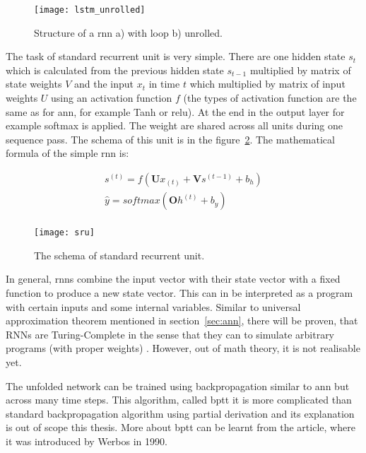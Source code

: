 \documentclass[thesis=M,english]{FITthesis}[2012/10/20]
\begin{document}
\begin{figure}[ht]\centering
    \texttt{[image: lstm\_unrolled]}
    \caption{Structure of a \gls{rnn} a) with loop b) unrolled.\cite{lstm_images}}\label{fig:rnn}
\end{figure}

The task of standard recurrent unit is very simple. There are one hidden state $s_t$ which is calculated from the previous hidden state $s_{t-1}$ multiplied by matrix of state weights $V$ and the input $x_t$ in time $t$ which multiplied by matrix of input weights $U$ using an activation function $f$ (the types of activation function are the same as for \gls{ann}, for example Tanh or \gls{relu}). At the end in the output layer for example softmax is applied. The weight are shared across all units during one sequence pass. The schema of this unit is in the figure~\ref{fig:sru}. The mathematical formula of the simple \gls{rnn} is:

\begin{equation}
\begin{multlined}
s^{(t)} = f(\mathbf{U} x_{(t)} + \mathbf{V} s^{(t-1)} + b_h) \\ 
\hat{y} = softmax(\mathbf{O} h^{(t)} + b_y)\\
\end{multlined}
\end{equation}

\begin{figure}[ht]\centering
    \texttt{[image: sru]}
    \caption{The schema of standard recurrent unit.}\label{fig:sru}
\end{figure}

In general, \gls{rnn}s combine the input vector with their state vector with a fixed function to produce a new state vector. This can in be interpreted as a program with certain inputs and some internal variables. Similar to universal approximation theorem mentioned in section~\ref{sec:ann}, there will be proven, that RNNs are Turing-Complete in the sense that they can to simulate arbitrary programs (with proper weights) \cite{Siegelmann1991turing}. However, out of math theory, it is not realisable yet. 

The unfolded network can be trained using backpropagation similar to \gls{ann} but across many time steps. This algorithm, called \gls{bptt} it is more complicated than standard backpropagation algorithm using partial derivation and its explanation is out of scope this thesis. More about \gls{bptt} can be learnt from the article\cite{Werbos1990bptt}, where it was introduced by Werbos in 1990. 
\end{document}
